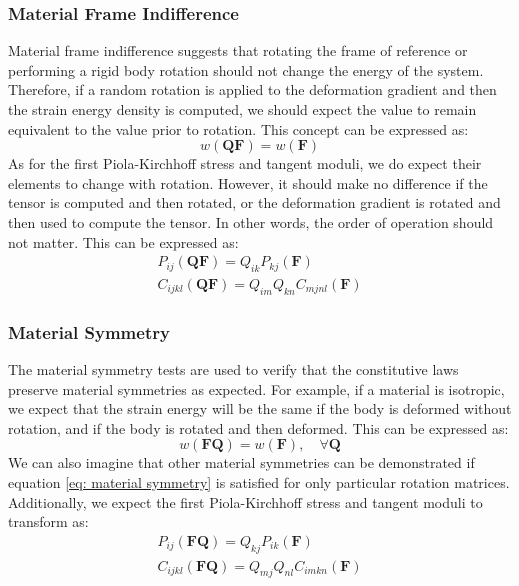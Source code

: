 \documentclass[]{spie}  %
\begin{document}
\subsubsection{Material Frame Indifference}
Material frame indifference suggests that rotating the frame of reference or performing a rigid body rotation should not change the energy of the system. Therefore, if a random rotation is applied to the deformation gradient and then the strain energy density is computed, we should expect the value to remain equivalent to the value prior to rotation. This concept can be expressed as:
\begin{equation}
	w(\bm{Q}\bm{F}) = w(\bm{F})
\end{equation}
As for the first Piola-Kirchhoff stress and tangent moduli, we do expect their elements to change with rotation. However, it should make no difference if the tensor is computed and then rotated, or the deformation gradient is rotated and then used to compute the tensor. In other words, the order of operation should not matter. This can be expressed as:
\begin{gather}
	P_{ij}(\bm{Q}\bm{F}) = Q_{ik}P_{kj}(\bm{F}) \\
	C_{ijkl}(\bm{Q}\bm{F}) = Q_{im}Q_{kn}C_{mjnl}(\bm{F})
\end{gather}

\subsubsection{Material Symmetry}
The material symmetry tests are used to verify that the constitutive laws preserve material symmetries as expected. For example, if a material is isotropic, we expect that the strain energy will be the same if the body is deformed without rotation, and if the body is rotated and then deformed. This can be expressed as:
\begin{equation}
	\label{eq: material symmetry}
	w(\bm{F}\bm{Q}) = w(\bm{F}) , \quad \forall \bm{Q}
\end{equation}
We can also imagine that other material symmetries can be demonstrated if equation \ref{eq: material symmetry} is satisfied for only particular rotation matrices. Additionally, we expect the first Piola-Kirchhoff stress and tangent moduli to transform as:
\begin{gather}
	P_{ij}(\bm{F}\bm{Q}) = Q_{kj}P_{ik}(\bm{F}) \\
	C_{ijkl}(\bm{F}\bm{Q}) = Q_{mj}Q_{nl}C_{imkn}(\bm{F})
\end{gather}
\end{document}
